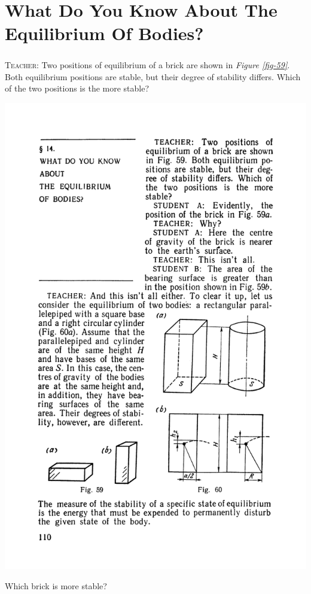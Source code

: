 \documentclass[a4paper,sfsidenotes]{tufte-book}
\begin{document}
\chapter{What Do You Know About The Equilibrium Of Bodies?}
\label{ch-14}

\paragraph{}
\textsc{Teacher:} Two positions of equilibrium of a brick are shown in \emph{Figure \ref{fig-59}}. Both equilibrium positions are stable, but their degree of stability differs. Which of the two positions is the more stable?
\\
\begin{marginfigure}
\centering
\includegraphics[width=\linewidth]{fig-059a.pdf}
\caption{Which brick is more stable?}
\label{fig-59}
\end{marginfigure}
\end{document}
